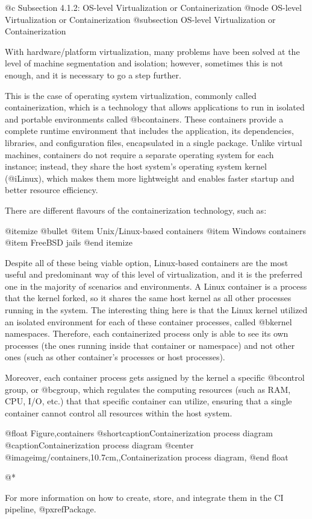@c Subsection 4.1.2: OS-level Virtualization or Containerization
@node OS-level Virtualization or Containerization
@subsection OS-level Virtualization or Containerization

With hardware/platform virtualization, many problems have been solved at the level of machine segmentation and isolation; however, sometimes this is not enough, and it is necessary to go a step further.

This is the case of operating system virtualization, commonly called containerization, which is a technology that allows applications to run in isolated and portable environments called @b{containers}. These containers provide a complete runtime environment that includes the application, its dependencies, libraries, and configuration files, encapsulated in a single package. Unlike virtual machines, containers do not require a separate operating system for each instance; instead, they share the host system's operating system kernel (@i{Linux}), which makes them more lightweight and enables faster startup and better resource efficiency.

There are different flavours of the containerization technology, such as:

@itemize @bullet
@item Unix/Linux-based containers
@item Windows containers
@item FreeBSD jails
@end itemize

Despite all of these being viable option, Linux-based containers are the most useful and predominant way of this level of virtualization, and it is the preferred one in the majority of scenarios and environments. A Linux container is a process that the kernel forked, so it shares the same host kernel as all other processes running in the system. The interesting thing here is that the Linux kernel utilized an isolated environment for each of these container processes, called @b{kernel namespaces}. Therefore, each containerized process only is able to see its own processes (the ones running inside that container or namespace) and not other ones (such as other container's processes or host processes).

Moreover, each container process gets assigned by the kernel a specific @b{control group}, or @b{cgroup}, which regulates the computing resources (such as RAM, CPU, I/O, etc.) that that specific container can utilize, ensuring that a single container cannot control all resources within the host system.

@float Figure,containers
@shortcaption{Containerization process diagram}
@caption{Containerization process diagram}
@center @image{img/containers,10.7cm,,Containerization process diagram,}
@end float

@*

For more information on how to create, store, and integrate them in the CI pipeline, @pxref{Package}.
